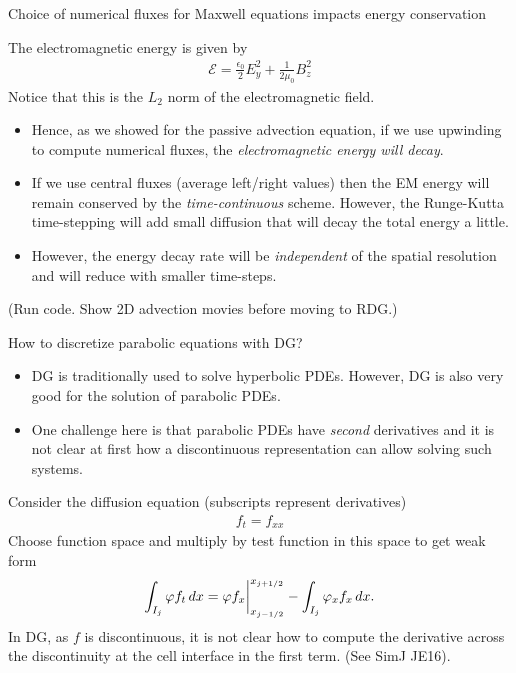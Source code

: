 \documentclass[pdf]{beamer}
\theoremstyle{definition}
\begin{document}
\begin{frame}{Choice of numerical fluxes for Maxwell equations impacts
    energy conservation}

  The electromagnetic energy is given by
  \begin{align*}
    \mathcal{E} = \frac{\epsilon_0}{2} E_y^2 + \frac{1}{2\mu_0} B_z^2
  \end{align*}
  Notice that this is the $L_2$ norm of the electromagnetic
  field. 
  \begin{itemize}
  \item Hence, as we showed for the passive advection equation, if we
    use upwinding to compute numerical fluxes, the
    \emph{electromagnetic energy will decay}.
  \item If we use central fluxes (average left/right values) then the
    EM energy will remain conserved by the \emph{time-continuous}
    scheme. However, the Runge-Kutta time-stepping will add small
    diffusion that will decay the total energy a little.
  \item However, the energy decay rate will be \emph{independent} of
    the spatial resolution and will reduce with smaller time-steps.
  \end{itemize}
  (Run code. Show 2D advection movies before moving to RDG.)
\end{frame}


\begin{frame}{How to discretize parabolic equations with DG?}
  \footnotesize%
  \begin{itemize}
  \item DG is traditionally used to solve hyperbolic PDEs. However, DG is
    also very good for the solution of parabolic PDEs.
  \item One challenge here is that parabolic PDEs have \emph{second}
    derivatives and it is not clear at first how a discontinuous
    representation can allow solving such systems.
  \end{itemize}
  Consider the diffusion equation (subscripts represent derivatives)
  \begin{align*}
    f_t = f_{xx}
  \end{align*}
  Choose function space and multiply by test function in this space to
  get weak form
  \begin{align*}
    \int_{I_j} \varphi f_t \thinspace dx =   \varphi f_x \bigg|^{x_{j+1/2}}_{x_{j-1/2}}
    -
    \int_{I_j} \varphi_{x} f_x \thinspace dx.
  \end{align*}
  In DG, as $f$ is discontinuous, it is not clear how to compute the
  derivative across the discontinuity at the cell interface in the
  first term. (See SimJ JE16).
  
\end{frame}
\end{document}
